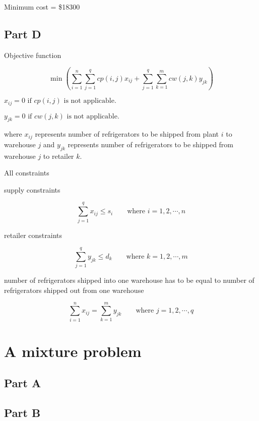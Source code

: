 \documentclass[11pt]{scrreprt}
\begin{document}
Minimum cost = \$18300

\section{Part D}

Objective function

\begin{displaymath}
\min \left(\sum_{i=1}^{n} \sum_{j=1}^{q} cp(i,j)x_{ij} + \sum_{j=1}^{q} \sum_{k=1}^{m} cw(j,k)y_{jk}\right)
\end{displaymath}

$x_{ij}=0 \textrm{ if } cp(i,j) \textrm{ is not applicable. } $

$y_{jk}=0 \textrm{ if } cw(j,k) \textrm{ is not applicable.} $

where $x_{ij}$ represents number of refrigerators to be shipped from plant $i$ to warehouse $j$ and $y_{jk}$ represents number of refrigerators to be shipped  from warehouse $j$ to retailer $k$.

All constraints

supply constraints

\begin{displaymath}
\sum_{j=1}^{q} x_{ij} \leq s_i \qquad\textrm{where } i=1,2,\cdots,n
\end{displaymath}

retailer constraints

\begin{displaymath}
\sum_{j=1}^{q} y_{jk} \leq d_k \qquad\textrm{where } k=1,2,\cdots,m
\end{displaymath}

number of refrigerators shipped into one warehouse has to be equal to number of refrigerators shipped out from one warehouse

\begin{displaymath}
\sum_{i=1}^{n} x_{ij} = \sum_{k=1}^{m} y_{jk} \qquad\textrm{where } j=1,2,\cdots,q
\end{displaymath}

\chapter{A mixture problem}

\section{Part A}


\section{Part B}
\end{document}
